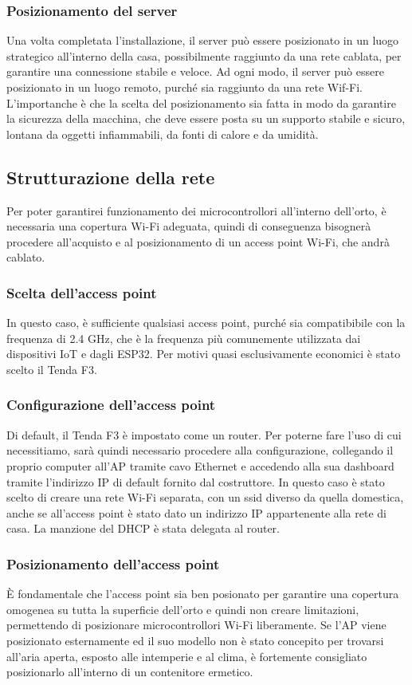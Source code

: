 \documentclass[11pt, a4paper]{article}
\begin{document}
\subsubsection{Posizionamento del server}
Una volta completata l'installazione, il server può essere posizionato in un luogo strategico all'interno della casa,
possibilmente raggiunto da una rete cablata, per garantire una connessione stabile e veloce.
Ad ogni modo, il server può essere posizionato in un luogo remoto, purché sia raggiunto da una rete Wif-Fi.
L'importanche è che la scelta del posizionamento sia fatta in modo da garantire la sicurezza della macchina, che deve
essere posta su un supporto stabile e sicuro, lontana da oggetti infiammabili, da fonti di calore e da umidità.

\subsection{Strutturazione della rete}
Per poter garantirei funzionamento dei microcontrollori all'interno dell'orto, è 
necessaria una copertura Wi-Fi adeguata, quindi di conseguenza bisognerà procedere
all'acquisto e al posizionamento di un access point Wi-Fi, che andrà cablato.

\subsubsection{Scelta dell'access point}
In questo caso, è sufficiente qualsiasi access point, purché sia compatibibile con
la frequenza di 2.4 GHz, che è la frequenza più comunemente utilizzata dai dispositivi IoT e
dagli ESP32. Per motivi quasi esclusivamente economici è stato scelto il Tenda F3.

\subsubsection{Configurazione dell'access point}
Di default, il Tenda F3 è impostato come un router. Per poterne fare l'uso di cui
necessitiamo, sarà quindi necessario procedere alla configurazione, collegando
il proprio computer all'AP tramite cavo Ethernet e accedendo alla sua dashboard
tramite l'indirizzo IP di default fornito dal costruttore.
In questo caso è stato scelto di creare una rete Wi-Fi separata, con un ssid diverso
da quella domestica, anche se all'access point è stato dato un indirizzo IP appartenente
alla rete di casa. La manzione del DHCP è stata delegata al router.

\subsubsection{Posizionamento dell'access point}
È fondamentale che l'access point sia ben posionato per garantire una copertura omogenea
su tutta la superficie dell'orto e quindi non creare limitazioni, permettendo di posizionare
microcontrollori Wi-Fi liberamente. Se l'AP viene posizionato esternamente ed
il suo modello non è stato concepito per trovarsi all'aria aperta, esposto
alle intemperie e al clima, è fortemente consigliato posizionarlo all'interno di un
contenitore ermetico.
\end{document}
